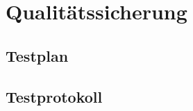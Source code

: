 \newpage

\chapter{Qualitätssicherung}
\label{cha:qualitätssicherung}

\section{Testplan}
\label{sec:testplan}

\section{Testprotokoll}
\label{sec:testprotokoll}